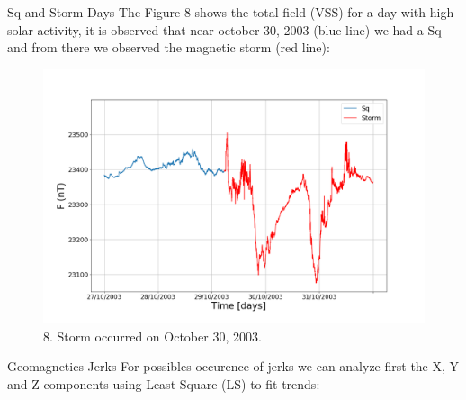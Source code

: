 \documentclass[final,t]{beamer}
\begin{document}
\begin{columns}[t]
\begin{column}{.25\linewidth}
\begin{block}{Sq and Storm Days}
	\justifying
The Figure 8 shows the total field (VSS) for a day with high solar activity, it is observed that near october 30, 2003 (blue line) we had a Sq and from there we observed the magnetic storm (red line): 

	\begin{figure}
		\centering
		\includegraphics[scale=0.5]{F27_31_october(2003)}
		\caption{\small 8. Storm occurred on October 30, 2003.}
		\label{fig:F27_31_october(2003)}
	\end{figure}
	
	
\end{block}	

	\begin{block}{Geomagnetics Jerks}
		\justifying
		For possibles occurence of jerks we can analyze first the X, Y and Z components using Least Square (LS) to fit trends: 	
		

\end{block}
\end{column}
\end{columns}
\end{document}
